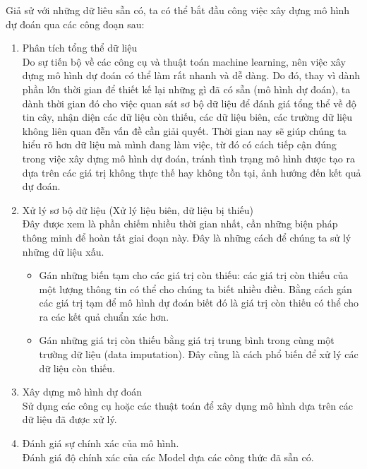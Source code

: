 Giả sử với những dữ liêu sẵn có, ta có thể bắt đầu công việc xây dựng mô hình dự đoán qua các công đoạn sau:
\begin{enumerate}
    \item Phân tích tổng thể dữ liệu \\
    Do sự tiến bộ về các công cụ và thuật toán machine learning, nên việc xây dựng mô hình dự đoán có thể làm rất nhanh và dễ dàng. Do đó, thay vì dành phần lớn thời gian để thiết kế lại những gì đã có sẵn (mô hình dự đoán), ta dành thời gian đó cho việc quan sát sơ bộ dữ liệu để đánh giá tổng thể về độ tin cây, nhận diện các dữ liệu còn thiếu, các dữ liệu biên, các trường dữ liệu không liên quan đễn vấn đề cần giải quyết. Thời gian nay sẽ giúp chúng ta hiểu rõ hơn dữ liệu mà mình đang làm việc, từ đó có cách tiếp cận đúng trong việc xây dựng mô hình dự đoán, tránh tình trạng mô hình được tạo ra dựa trên các giá trị không thực thế hay không tồn tại, ảnh hướng đến kết quả dự đoán.
    \item Xử lý sơ bộ dữ liệu (Xử lý liệu biên, dữ liệu bị thiếu) \\
    Đây được xem là phần chiếm nhiều thời gian nhất, cần những biện pháp thông minh để hoàn tất giai đoạn này. Đây là những cách để chúng ta sử lý những dữ liệu xấu.
    \begin{itemize}
	    \item Gán những biến tạm cho các giá trị còn thiếu: các giá trị còn thiếu của một  lượng thông tin có thể cho chúng ta biết nhiều điều. Bằng cách gán các giá trị tạm để mô hình dự đoán biết đó là giá trị còn thiếu có thể cho ra các kết quả chuẩn xác hơn. \\
	    \item Gán những giá trị còn thiếu bằng giá trị trung bình trong cùng một trường dữ liệu (data imputation). Đây cũng là cách phổ biến để xử lý các dữ liệu còn thiếu. \\
    \end{itemize}
    \item Xây dựng mô hình dự đoán \\
    Sử dụng các công cụ hoặc các thuật toán để xây dụng mô hình dựa trên các dữ liệu đã được xử lý. \\
    \item Đánh giá sự chính xác của mô hình. \\
    Đánh giá độ chính xác của các Model dựa các công thức đã sẵn có. \\
\end{enumerate}
